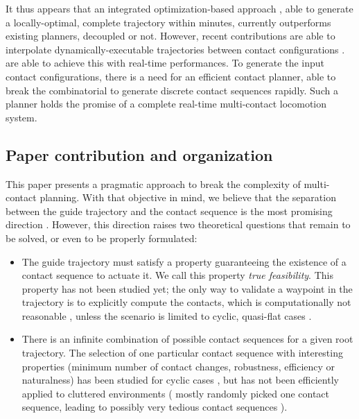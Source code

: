 It thus appears that an integrated optimization-based approach \citep{Mordatch:2012:DCB:2185520.2185539}, able to generate a locally-optimal, complete trajectory within minutes, currently outperforms
existing planners, decoupled or not. However, recent contributions are able to interpolate dynamically-executable 
trajectories between contact configurations \citep{herzog2015trajectory, Carpentier2016}. \citeauthor{Carpentier2016} are able to achieve this with real-time performances.
To generate the input contact configurations, there is a need for an efficient contact planner, able to break the combinatorial to generate discrete contact sequences rapidly. 
Such a planner holds the promise of a complete real-time multi-contact locomotion system.

\subsection{Paper contribution and organization}
This paper presents a pragmatic approach to break the complexity of multi-contact planning. With that objective in mind,
we believe that the separation between the  guide trajectory and the contact sequence is the most promising direction \citep{DBLP:conf/iser/EscandeKMG08}.
However, this direction raises two theoretical questions that remain to be solved, or even to be properly formulated:
\begin{itemize}
\item The guide trajectory must satisfy a property guaranteeing  the existence of a contact sequence to actuate it. We call this property \textit{true feasibility}. This property has not been studied yet; the only way to validate a waypoint in the trajectory is to explicitly compute the contacts, which is computationally not reasonable \citep{Bouyarmane2009}, unless the scenario is limited to cyclic, quasi-flat cases \citep{zucker2010optimization}.
\item There is an infinite combination  of possible contact sequences for a given root trajectory. The selection of one particular contact sequence with interesting properties (minimum number of contact changes, robustness, efficiency or naturalness) has been studied for cyclic cases \citep{Hauser06usingmotion}, but has not been efficiently applied to cluttered environments (\citeauthor{bouyarmane:lirmm-00777727, DBLP:conf/iser/EscandeKMG08} mostly randomly picked one contact sequence, leading to possibly very tedious contact sequences ).
\end{itemize}

